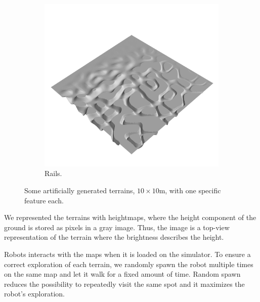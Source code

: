 \documentclass[../document.tex]{subfiles}
\begin{document}
\begin{figure}[htbp]
\begin{subfigure}[b]{0.24\textwidth}
 \end{subfigure}  
    \begin{subfigure}[b]{0.24\textwidth}
        \includegraphics[width=\linewidth]{../img/hm3d/rails3.png}
        \caption{Rails.}
    \end{subfigure}  
\caption{Some artificially generated terrains, $10\times 10$m, with one specific feature each. }   
\label{fig : grounds}
\end{figure}
We represented the terrains with heightmaps, where the height component of the ground is stored as pixels in a gray image. Thus, the image is a top-view representation of the terrain where the brightness describes the height. 

Robots interacts with the maps when it is loaded on the simulator. To ensure a correct exploration of each terrain, we randomly spawn the robot multiple times on the same map and let it walk for a fixed amount of time. Random spawn reduces the possibility to repeatedly visit the same spot and it maximizes the robot's exploration.
\end{document}
